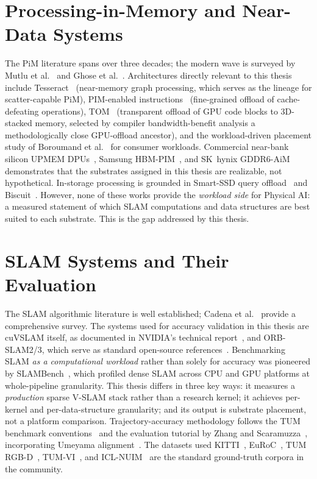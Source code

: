 \section{Processing-in-Memory and Near-Data Systems}

The PiM literature spans over three decades; the modern wave is surveyed by Mutlu et al.~\cite{mutlu2019pim} and Ghose et al.~\cite{ghose2019pim}. Architectures directly relevant to this thesis include Tesseract~\cite{ahn2015tesseract} (near-memory graph processing, which serves as the lineage for scatter-capable PiM), PIM-enabled instructions~\cite{ahn2015pei} (fine-grained offload of cache-defeating operations), TOM~\cite{hsieh2016tom} (transparent offload of GPU code blocks to 3D-stacked memory, selected by compiler bandwidth-benefit analysis a methodologically close GPU-offload ancestor), and the workload-driven placement study of Boroumand et al.~\cite{boroumand2018google} for consumer workloads. Commercial near-bank silicon UPMEM DPUs~\cite{gomezluna2021upmem}, Samsung HBM-PIM~\cite{kwon2021hbmpim}, and SK~hynix GDDR6-AiM~\cite{lee2022aim} demonstrates that the substrates assigned in this thesis are realizable, not hypothetical. In-storage processing is grounded in Smart-SSD query offload~\cite{do2013smartssd} and Biscuit~\cite{gu2016biscuit}. However, none of these works provide the \emph{workload side} for Physical AI: a measured statement of which SLAM computations and data structures are best suited to each substrate. This is the gap addressed by this thesis.

\section{SLAM Systems and Their Evaluation}

The SLAM algorithmic literature is well established; Cadena et al.~\cite{cadena2016slam} provide a comprehensive survey. The systems used for accuracy validation in this thesis are cuVSLAM itself, as documented in NVIDIA's technical report~\cite{cuvslam2025}, and ORB-SLAM2/3, which serve as standard open-source references~\cite{murartal2017orbslam2,campos2021orbslam3}. Benchmarking SLAM \emph{as a computational workload} rather than solely for accuracy was pioneered by SLAMBench~\cite{nardi2015slambench}, which profiled dense SLAM across CPU and GPU platforms at whole-pipeline granularity. This thesis differs in three key ways: it measures a \emph{production} sparse V-SLAM stack rather than a research kernel; it achieves per-kernel and per-data-structure granularity; and its output is substrate placement, not a platform comparison. Trajectory-accuracy methodology follows the TUM benchmark conventions~\cite{sturm2012tum} and the evaluation tutorial by Zhang and Scaramuzza~\cite{zhang2018tutorial}, incorporating Umeyama alignment~\cite{umeyama1991}. The datasets used KITTI~\cite{geiger2013kitti}, EuRoC~\cite{burri2016euroc}, TUM RGB-D~\cite{sturm2012tum}, TUM-VI~\cite{schubert2018tumvi}, and ICL-NUIM~\cite{handa2014iclnuim} are the standard ground-truth corpora in the community.

